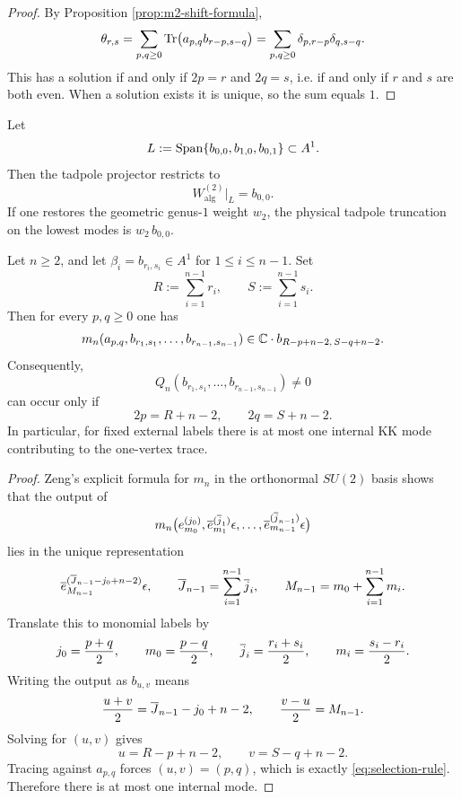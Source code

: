 \begin{proof}
By Proposition \ref{prop:m2-shift-formula},
\[
\theta_{r,s}
=
\sum_{p,q\ge 0}\operatorname{Tr}\bigl(a_{p,q} b_{r-p,s-q}\bigr)
=
\sum_{p,q\ge 0}\delta_{p,r-p}\delta_{q,s-q}.
\]
This has a solution if and only if $2p=r$ and $2q=s$, i.e. if and only if $r$ and $s$ are both
even. When a solution exists it is unique, so the sum equals $1$.
\end{proof}

\begin{corollary}
\label{cor:lowest-mode-tadpole}
Let
\[
L:=\operatorname{Span}\{b_{0,0},b_{1,0},b_{0,1}\}\subset A^1.
\]
Then the tadpole projector restricts to
\[
W^{(2)}_{\mathrm{alg}}\big|_L=b_{0,0}.
\]
If one restores the geometric genus-$1$ weight $w_2$, the physical tadpole truncation on the
lowest modes is $w_2\,b_{0,0}$.
\end{corollary}

\begin{theorem}
\label{thm:one-vertex-trace-selection-rule}
Let $n\ge 2$, and let $\beta_i=b_{r_i,s_i}\in A^1$ for $1\le i\le n-1$. Set
\[
R:=\sum_{i=1}^{n-1} r_i,
\qquad
S:=\sum_{i=1}^{n-1} s_i.
\]
Then for every $p,q\ge 0$ one has
\[
m_n(a_{p,q},b_{r_1,s_1},\dots,b_{r_{n-1},s_{n-1}})
\in
\mathbb C\cdot b_{R-p+n-2,\,S-q+n-2}.
\]
Consequently,
\[
Q_n(b_{r_1,s_1},\dots,b_{r_{n-1},s_{n-1}})\neq 0
\]
can occur only if
\begin{equation}
\label{eq:selection-rule}
2p=R+n-2,
\qquad
2q=S+n-2.
\end{equation}
In particular, for fixed external labels there is at most one internal KK mode contributing to
the one-vertex trace.
\end{theorem}

\begin{proof}
Zeng's explicit formula for $m_n$ in the orthonormal $SU(2)$ basis shows that the output of
\[
m_n\bigl(e_{m_0}^{(j_0)},\overline{e}_{m_1}^{(\overline{j}_1)}\epsilon,\dots,
\overline{e}_{m_{n-1}}^{(\overline{j}_{n-1})}\epsilon\bigr)
\]
lies in the unique representation
\[
\overline{e}_{M_{n-1}}^{(\overline{J}_{n-1}-j_0+n-2)}\epsilon,
\qquad
\overline{J}_{n-1}=\sum_{i=1}^{n-1}\overline{j}_i,
\qquad
M_{n-1}=m_0+\sum_{i=1}^{n-1}m_i.
\]
Translate this to monomial labels by
\[
j_0=\frac{p+q}{2},\qquad m_0=\frac{p-q}{2},
\qquad
\overline{j}_i=\frac{r_i+s_i}{2},\qquad m_i=\frac{s_i-r_i}{2}.
\]
Writing the output as $b_{u,v}$ means
\[
\frac{u+v}{2}=\overline{J}_{n-1}-j_0+n-2,
\qquad
\frac{v-u}{2}=M_{n-1}.
\]
Solving for $(u,v)$ gives
\[
u=R-p+n-2,
\qquad
v=S-q+n-2.
\]
Tracing against $a_{p,q}$ forces $(u,v)=(p,q)$, which is exactly
\eqref{eq:selection-rule}. Therefore there is at most one internal mode.
\end{proof}


